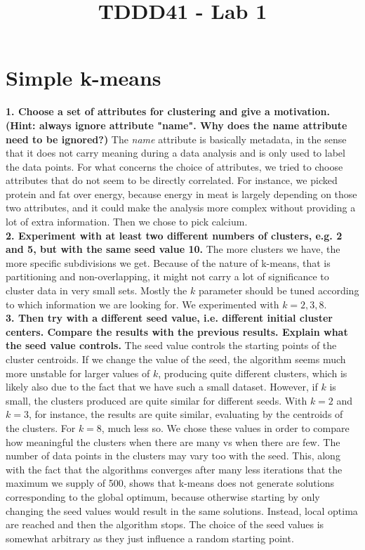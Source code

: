 \documentclass[]{article}
\title{TDDD41 - Lab 1}
\author{}
\begin{document}
\maketitle

\section{Simple k-means}

\textbf{1. Choose a set of attributes for clustering and give a motivation. (Hint: always ignore attribute "name". Why does the name attribute need to be ignored?)}
The \textit{name} attribute is basically metadata, in the sense that it does not carry meaning during a data analysis and is only used to label the data points. For what concerns the choice of attributes, we tried to choose attributes that do not seem to be directly correlated. For instance, we picked protein and fat over energy, because energy in meat is largely depending on those two attributes, and it could make the analysis more complex without providing a lot of extra information. Then we chose to pick calcium.\\

\noindent\textbf{2. Experiment with at least two different numbers of clusters, e.g. 2 and 5, but with the same seed value 10.}
The more clusters we have, the more specific subdivisions we get. Because of the nature of k-means, that is partitioning and non-overlapping, it might not carry a lot of significance to cluster data in very small sets. Mostly the $k$ parameter should be tuned according to which information we are looking for. We experimented with $k=2,3,8$.\\

\noindent\textbf{3. Then try with a different seed value, i.e. different initial cluster centers. Compare the results with the previous results. Explain what the seed value controls.}
The seed value controls the starting points of the cluster centroids. If we change the value of the seed, the algorithm seems much more unstable for larger values of $k$, producing quite different clusters, which is likely also due to the fact that we have such a small dataset. However, if $k$ is small, the clusters produced are quite similar for different seeds. With $k=2$ and $k=3$, for instance, the results are quite similar, evaluating by the centroids of the clusters. For $k=8$, much less so. We chose these values in order to compare how meaningful the clusters when there are many vs when there are few. The number of data points in the clusters may vary too with the seed. This, along with the fact that the algorithms converges after many less iterations that the maximum we supply of 500, shows that k-means does not generate solutions corresponding to the global optimum, because otherwise starting by only changing the seed values would result in the same solutions. Instead, local optima are reached and then the algorithm stops. The choice of the seed values is somewhat arbitrary as they just influence a random starting point.
\end{document}
